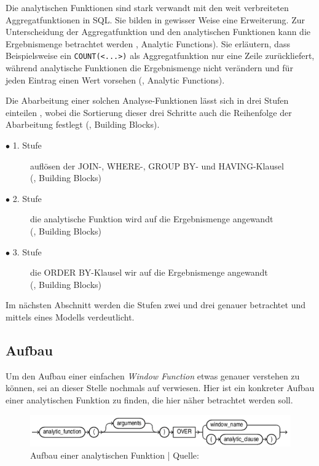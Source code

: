 Die analytischen Funktionen sind stark verwandt mit den weit verbreiteten
Aggregatfunktionen in SQL. Sie bilden in gewisser Weise eine Erweiterung. Zur
Unterscheidung der Aggregatfunktion und den analytischen Funktionen kann die
Ergebnismenge betrachtet werden \cite{Nuijten2023}, Analytic Functions). Sie erläutern,
dass Beispielsweise ein \texttt{COUNT(<...>)} als Aggregatfunktion nur eine Zeile
zurückliefert, während analytische Funktionen die Ergebnismenge nicht verändern
und für jeden Eintrag einen Wert vorsehen (\cite{Nuijten2023}, Analytic
Functions).

Die Abarbeitung einer solchen Analyse-Funktionen lässt sich in drei Stufen einteilen
, wobei die Sortierung dieser drei Schritte auch die Reihenfolge der Abarbeitung
festlegt (\cite{Nuijten2023}, Building Blocks).
\begin{description}
	\item[$\bullet$ 1. Stufe] auflösen der JOIN-, WHERE-, GROUP BY- und HAVING-Klausel
		\\ (\cite{Nuijten2023}, Building Blocks)

	\item[$\bullet$ 2. Stufe] die analytische Funktion wird auf die Ergebnismenge angewandt
		\\ (\cite{Nuijten2023}, Building Blocks)

	\item[$\bullet$ 3. Stufe] die ORDER BY-Klausel wir auf die Ergebnismenge angewandt
		\\ (\cite{Nuijten2023}, Building Blocks)
\end{description}
Im nächsten Abschnitt werden die Stufen zwei und drei genauer betrachtet und mittels
eines Modells verdeutlicht.

\subsection{Aufbau}
Um den Aufbau einer einfachen \textit{Window Function} etwas genauer verstehen
zu können, sei an dieser Stelle nochmals auf \cite{oracle} verwiesen. Hier ist
ein konkreter Aufbau einer analytischen Funktion zu finden, die hier näher betrachtet
werden soll.

\begin{figure}[h]
	\centering
	\includegraphics[scale=0.5]{img/aufbauAnalyticFunction.jpg}
	\caption{ Aufbau einer analytischen Funktion | Quelle: \cite{oracle}}
	\label{fig:aufbauAnalyticFunction}
\end{figure}

